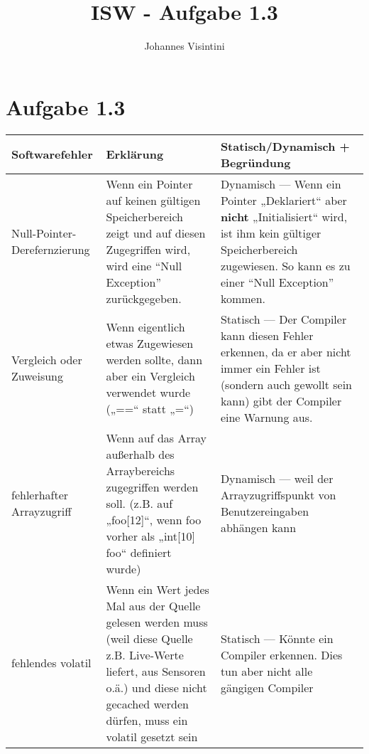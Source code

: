 \documentclass{scrartcl}
\begin{document}
\title{ISW - Aufgabe 1.3}
\author{Johannes Visintini}
\maketitle

\section*{Aufgabe 1.3}
\begin{tabular}{|p{3cm}|p{7cm}|p{7cm}|}\hline
	\textbf{Softwarefehler}
		& \textbf{Erklärung}
		& \textbf{Statisch/Dynamisch + Begründung}\\\hline
	Null-Pointer-Derefernzierung
		& Wenn ein Pointer auf keinen gültigen Speicherbereich zeigt und auf
			diesen Zugegriffen wird, wird eine “Null Exception” zurückgegeben.
		& Dynamisch — Wenn ein Pointer „Deklariert“ aber \textbf{nicht}
			„Initialisiert“ wird, ist ihm kein gültiger Speicherbereich
			zugewiesen. So kann es zu einer “Null Exception” kommen.\\\hline
	Vergleich oder Zuweisung
		& Wenn eigentlich etwas Zugewiesen werden sollte, dann aber ein
			Vergleich verwendet wurde („==“ statt „=“)
		& Statisch — Der Compiler kann diesen Fehler erkennen, da er aber nicht
			immer ein Fehler ist (sondern auch gewollt sein kann) gibt der
			Compiler eine Warnung aus.\\\hline
	fehlerhafter Arrayzugriff
		& Wenn auf das Array außerhalb des Arraybereichs zugegriffen werden
			soll. (z.B. auf „foo[12]“, wenn foo vorher als „int[10] foo“
			definiert wurde)
		& Dynamisch — weil der Arrayzugriffspunkt von Benutzereingaben abhängen
			kann\\\hline
	fehlendes volatil
		& Wenn ein Wert jedes Mal aus der Quelle gelesen werden muss (weil
			diese Quelle z.B. Live-Werte liefert, aus Sensoren o.ä.) und diese
			nicht gecached werden dürfen, muss ein volatil gesetzt sein
		& Statisch — Könnte ein Compiler erkennen. Dies tun aber nicht alle
			gängigen Compiler\\\hline
\end{tabular}
\end{document}
